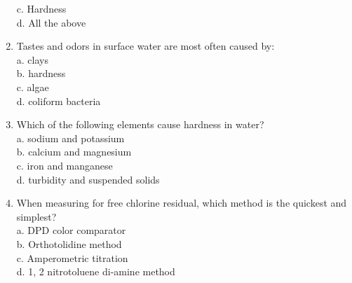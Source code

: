 \begin{enumerate}[1.]
c. Hardness\\
d. All the above\\
\item Tastes and odors in surface water are most often caused by:\\
a. clays\\
b. hardness\\
c. algae\\
d. coliform bacteria\\
\item Which of the following elements cause hardness in water?\\
a. sodium and potassium\\
b. calcium and magnesium\\
c. iron and manganese\\
d. turbidity and suspended solids\\
\item When measuring for free chlorine residual, which method is the quickest and simplest?\\
a. DPD color comparator\\
b. Orthotolidine method\\
c. Amperometric titration\\
d. 1, 2 nitrotoluene di-amine method\\


\end{enumerate}


